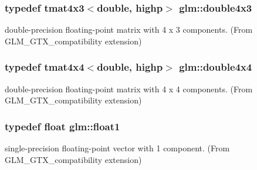 \hypertarget{group__gtx__compatibility_gadad0d5da7181385a05567469d4a5dd9a}{}
\subsubsection[{double4x3}]{\setlength{\rightskip}{0pt plus 5cm}typedef tmat4x3$<$double, highp$>$ {\bf glm\+::double4x3}}\label{group__gtx__compatibility_gadad0d5da7181385a05567469d4a5dd9a}


double-\/precision floating-\/point matrix with 4 x 3 components. (From G\+L\+M\+\_\+\+G\+T\+X\+\_\+compatibility extension) 

\hypertarget{group__gtx__compatibility_ga83ac0f28025f5e999b03094400fbddcb}{}
\subsubsection[{double4x4}]{\setlength{\rightskip}{0pt plus 5cm}typedef tmat4x4$<$double, highp$>$ {\bf glm\+::double4x4}}\label{group__gtx__compatibility_ga83ac0f28025f5e999b03094400fbddcb}


double-\/precision floating-\/point matrix with 4 x 4 components. (From G\+L\+M\+\_\+\+G\+T\+X\+\_\+compatibility extension) 

\hypertarget{group__gtx__compatibility_gae0ad1b0450320cda98bbbecb56bc3167}{}
\subsubsection[{float1}]{\setlength{\rightskip}{0pt plus 5cm}typedef float {\bf glm\+::float1}}\label{group__gtx__compatibility_gae0ad1b0450320cda98bbbecb56bc3167}


single-\/precision floating-\/point vector with 1 component. (From G\+L\+M\+\_\+\+G\+T\+X\+\_\+compatibility extension) 

\hypertarget{group__gtx__compatibility_gaac1faa940ac1fbb32d4a315005b578af}{}
